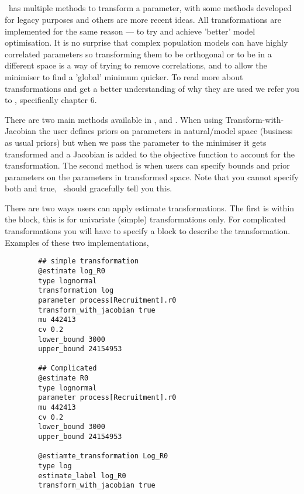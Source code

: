 \subsection{\label{sec:transformations}}

\CNAME\ has multiple methods to transform a parameter, with some methods developed for legacy purposes and others are more recent ideas. All transformations are implemented for the same reason --- to try and achieve 'better' model optimisation. It is no surprise that complex population models can have highly correlated parameters so transforming them to be orthogonal or to be in a different space is a way of trying to remove correlations, and to allow the minimiser to find a 'global' minimum quicker. To read more about transformations and get a better understanding of why they are used we refer you to \cite{gilks1995markov}, specifically chapter 6.

There are two main methods available in \CNAME,  and . When using Transform-with-Jacobian the user defines priors on parameters in natural/model space (business as usual priors) but when we pass the parameter to the minimiser it gets transformed and a Jacobian is added to the objective function to account for the transformation. The second method is when users can specify bounds and prior parameters on the parameters in transformed space. Note that you cannot specify both  and  true, \CNAME\ should gracefully tell you this.

There are two ways users can apply estimate transformations. The first is within the  block, this is for univariate (simple) transformations only. For complicated transformations you will have to specify a  block to describe the transformation. Examples of these two implementations,

{\small{\begin{verbatim}
		## simple transformation
		@estimate log_R0
		type lognormal
		transformation log
		parameter process[Recruitment].r0
		transform_with_jacobian true
		mu 442413
		cv 0.2
		lower_bound 3000
		upper_bound 24154953

		## Complicated
		@estimate R0
		type lognormal
		parameter process[Recruitment].r0
		mu 442413
		cv 0.2
		lower_bound 3000
		upper_bound 24154953

		@estiamte_transformation Log_R0
		type log
		estimate_label log_R0
		transform_with_jacobian true
		\end{verbatim}}}

